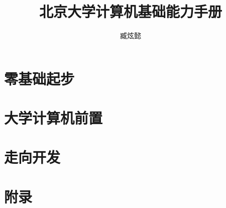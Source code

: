 \documentclass[openany]{ctexbook}
\title{\Huge\textbf{北京大学计算机基础能力手册}}
\author{臧炫懿}
\begin{document}
\maketitle

\frontmatter



\mainmatter

\tableofcontents

\part{零基础起步}









\part{大学计算机前置}









\part{走向开发}









\part{附录}

\appendix











\backmatter


\end{document}
